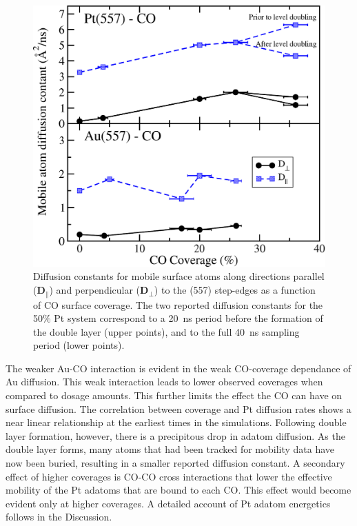 \begin{figure}[p!]
\includegraphics[width=\linewidth]{../figures/chap2/diffusion.pdf}
\caption{Diffusion constants for mobile surface atoms along directions
  parallel ($\mathbf{D}_{\parallel}$) and perpendicular
  ($\mathbf{D}_{\perp}$) to the (557) step-edges as a function of CO
  surface coverage.  The two reported diffusion constants for the 50\%
  Pt system correspond to a 20~ns period before the formation of the
  double layer (upper points), and to the full 40~ns sampling period
  (lower points).}
\label{fig:diff}
\end{figure}

The weaker Au-CO interaction is evident in the weak CO-coverage 
dependance of Au diffusion. This weak interaction leads to lower 
observed coverages when compared to dosage amounts. This further 
limits the effect the CO can have on surface diffusion. The correlation 
between coverage and Pt diffusion rates shows a near linear relationship 
at the earliest times in the simulations. Following double layer formation, 
however, there is a precipitous drop in adatom diffusion. As the double 
layer forms, many atoms that had been tracked for mobility data have 
now been buried, resulting in a smaller reported diffusion constant. A
secondary effect of higher coverages is CO-CO cross interactions that
lower the effective mobility of the Pt adatoms that are bound to each CO.
This effect would become evident only at higher coverages. A detailed
account of Pt adatom energetics follows in the Discussion.
 
